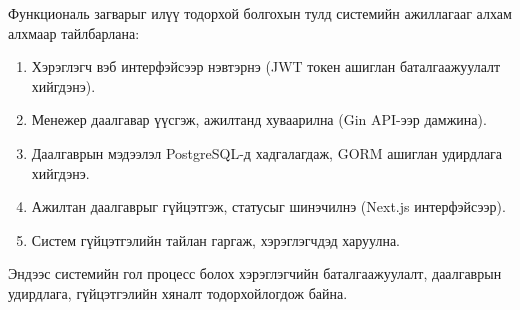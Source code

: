 
Функциональ загварыг илүү тодорхой болгохын тулд системийн ажиллагааг алхам алхмаар тайлбарлана:
\begin{enumerate}
    \item Хэрэглэгч вэб интерфэйсээр нэвтэрнэ (JWT токен ашиглан баталгаажуулалт хийгдэнэ).
    \item Менежер даалгавар үүсгэж, ажилтанд хуваарилна (Gin API-ээр дамжина).
    \item Даалгаврын мэдээлэл PostgreSQL-д хадгалагдаж, GORM ашиглан удирдлага хийгдэнэ.
    \item Ажилтан даалгаврыг гүйцэтгэж, статусыг шинэчилнэ (Next.js интерфэйсээр).
    \item Систем гүйцэтгэлийн тайлан гаргаж, хэрэглэгчдэд харуулна.
\end{enumerate}
Эндээс системийн гол процесс болох хэрэглэгчийн баталгаажуулалт, даалгаврын удирдлага, гүйцэтгэлийн хяналт тодорхойлогдож байна.
